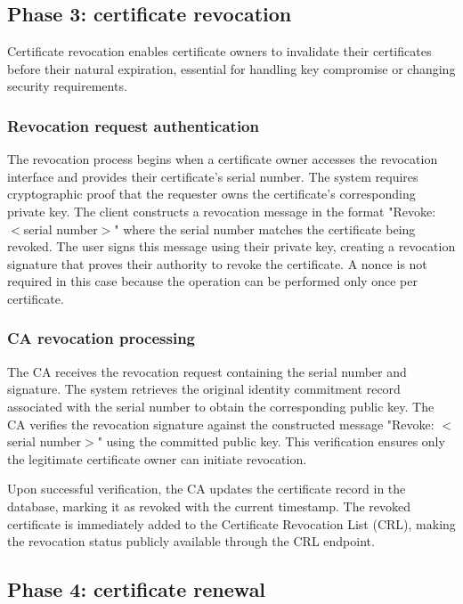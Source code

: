 \subsection{Phase 3: certificate revocation}

Certificate revocation enables certificate owners to invalidate their certificates 
before their natural expiration, essential for handling key compromise or 
changing security requirements.

\subsubsection{Revocation request authentication}

The revocation process begins when a certificate owner accesses the revocation 
interface and provides their certificate's serial number. The system requires 
cryptographic proof that the requester owns the certificate's corresponding 
private key.
The client constructs a revocation message in the format "Revoke: $<$serial number$>$" 
where the serial number matches the certificate being revoked. The user signs 
this message using their private key, creating a revocation signature that 
proves their authority to revoke the certificate. A nonce is not required in this
case because the operation can be performed only once per certificate.

\subsubsection{CA revocation processing}

The CA receives the revocation request containing the serial number and signature. 
The system retrieves the original identity commitment record associated with 
the serial number to obtain the corresponding public key.
The CA verifies the revocation signature against the constructed message 
"Revoke: $<$serial number$>$" using the committed public key. This verification 
ensures only the legitimate certificate owner can initiate revocation.

Upon successful verification, the CA updates the certificate record in the database, 
marking it as revoked with the current timestamp. The revoked certificate is 
immediately added to the Certificate Revocation List (CRL), making the revocation 
status publicly available through the CRL endpoint.

\subsection{Phase 4: certificate renewal}

